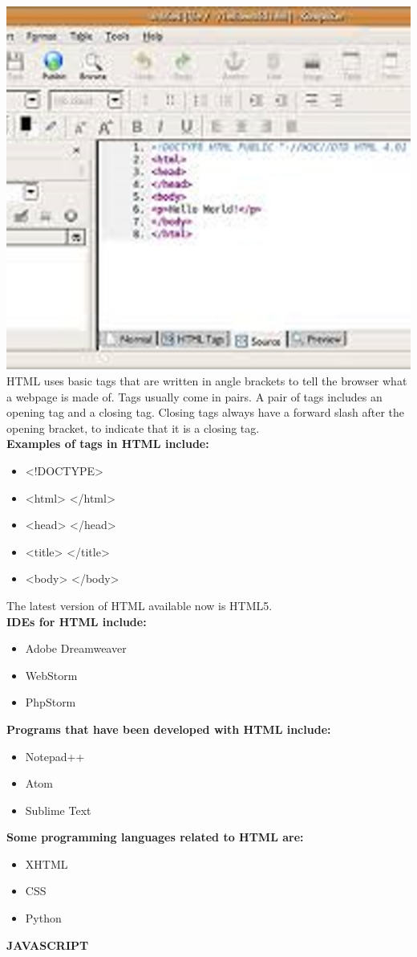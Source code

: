 \documentclass{article}
\begin{document}
\includegraphics[width=0.5\linewidth]{picture600}\\
HTML uses basic tags that are written in angle brackets to tell the browser what a webpage is made of. Tags usually come in pairs. A pair of tags includes an opening tag and a closing tag. Closing tags always have a forward slash after the opening bracket, to indicate that it is a closing tag.\\
 \textbf{Examples of tags in HTML include:}

\begin{itemize}
	\item <!DOCTYPE>
	\item <html> </html>
	\item <head> </head>
	\item <title> </title>
	\item <body> </body>	
\end{itemize}
The latest version of HTML available now is HTML5.\\
\textbf{IDEs for HTML include:}
\begin{itemize}
	\item Adobe Dreamweaver
	\item WebStorm
	\item PhpStorm
\end{itemize}
\textbf{Programs that have been developed with HTML include:}
\begin{itemize}
	\item Notepad++
	\item Atom
	\item Sublime Text
\end{itemize}
\textbf{Some programming languages related to HTML are:}
\begin{itemize}
	\item XHTML
	\item CSS
	\item Python
\end{itemize}
\textbf{JAVASCRIPT}\\
\end{document}
